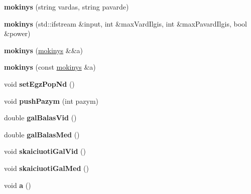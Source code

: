 \begin{DoxyCompactItemize}
\item 
\mbox{\label{classmokinys_aa6b4e929d1a196c8ab5b63a98235c410}} 
{\bfseries mokinys} (string vardas, string pavarde)
\item 
\mbox{\label{classmokinys_af9743202e3552d15c1d2d68dc21d38a2}} 
{\bfseries mokinys} (std\+::ifstream \&input, int \&max\+Vard\+Ilgis, int \&max\+Pavard\+Ilgis, bool \&power)
\item 
\mbox{\label{classmokinys_a76cca0c71608ac6e63069e3885c7ad78}} 
{\bfseries mokinys} (\mbox{\hyperlink{classmokinys}{mokinys}} \&\&a)
\item 
\mbox{\label{classmokinys_a51d68bdff6611d73364ccc8068c42e7d}} 
{\bfseries mokinys} (const \mbox{\hyperlink{classmokinys}{mokinys}} \&a)
\item 
\mbox{\label{classmokinys_a9f75b73abab7a283dc7b1e577833f6e6}} 
void {\bfseries set\+Egz\+Pop\+Nd} ()
\item 
\mbox{\label{classmokinys_af7699ec77b96ba24d26b077f1ec5899f}} 
void {\bfseries push\+Pazym} (int pazym)
\item 
\mbox{\label{classmokinys_ab4f858522630f28b2080c2535bd82fea}} 
double {\bfseries gal\+Balas\+Vid} ()
\item 
\mbox{\label{classmokinys_a941c60fd3df0ab548cd71598a1b26362}} 
double {\bfseries gal\+Balas\+Med} ()
\item 
\mbox{\label{classmokinys_a5f2c6bec496002d0a892dcee9c83f504}} 
void {\bfseries skaiciuoti\+Gal\+Vid} ()
\item 
\mbox{\label{classmokinys_ab1847bd6d6b026b250a5b134550e7c17}} 
void {\bfseries skaiciuoti\+Gal\+Med} ()
\item 
\mbox{\label{classmokinys_a3f293da59862e88b6024d318fa2be890}} 
void {\bfseries a} ()
\item 
\mbox{\label{classmokinys_af77a10505ac8e10a1183baae8f1d0db6}} 

\end{DoxyCompactItemize}

